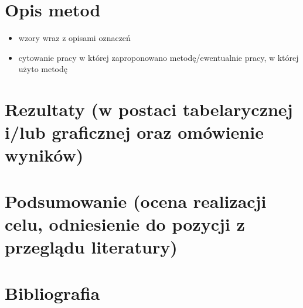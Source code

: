 \documentclass{article}
\begin{document}
\section{Opis metod}
    \begin{itemize}
        \item wzory wraz z opisami oznaczeń
        \item cytowanie pracy w której zaproponowano metodę/ewentualnie pracy, w której użyto metodę
    \end{itemize}

\section{Rezultaty (w postaci tabelarycznej i/lub graficznej oraz omówienie wyników)}
\section{Podsumowanie (ocena realizacji celu, odniesienie do pozycji z przeglądu literatury)}
\section{Bibliografia}
\end{document}
